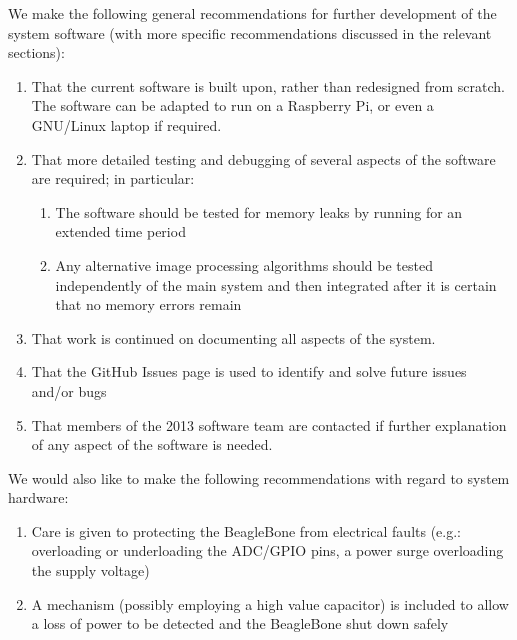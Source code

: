 We make the following general recommendations for further development of the system software (with more specific recommendations discussed in the relevant sections):
\begin{enumerate}
	\item That the current software is built upon, rather than redesigned from scratch. The software can be adapted to run on a Raspberry Pi, or even a GNU/Linux laptop if required.
	\item That more detailed testing and debugging of several aspects of the software are required; in particular:
	\begin{enumerate}
		\item The software should be tested for memory leaks by running for an extended time period
		\item Any alternative image processing algorithms should be tested independently of the main system and then integrated after it is certain that no memory errors remain
	\end{enumerate}
	\item That work is continued on documenting all aspects of the system.
	\item That the GitHub Issues page\cite{github_issues} is used to identify and solve future issues and/or bugs
	\item That members of the 2013 software team are contacted if further explanation of any aspect of the software is needed.
\end{enumerate}

We would also like to make the following recommendations with regard to system hardware:
\begin{enumerate}
	\item Care is given to protecting the BeagleBone from electrical faults (e.g.: overloading or underloading the ADC/GPIO pins, a power surge overloading the supply voltage)
	\item A mechanism (possibly employing a high value capacitor) is included to allow a loss of power to be detected and the BeagleBone shut down safely
\end{enumerate}



